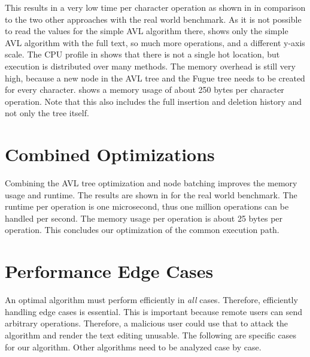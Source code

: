 This results in a very low time per character operation as shown in  in comparison to the two other approaches with the real world benchmark. As it is not possible to read the values for the \gls{simple AVL algorithm} there,  shows only the \gls{simple AVL algorithm} with the full text, so much more operations, and a different y-axis scale.
The CPU profile in  shows that there is not a single hot location, but execution is distributed over many methods. The memory overhead is still very high, because a new node in the AVL tree and the Fugue tree needs to be created for every character.  shows a memory usage of about 250 bytes per character operation. Note that this also includes the full insertion and deletion history and not only the tree itself.


\section{Combined Optimizations}

Combining the AVL tree optimization and node batching improves the memory usage and runtime. The results are shown in  for the real world benchmark. The runtime per operation is one microsecond, thus one million operations can be handled per second. The memory usage per operation is about 25 bytes per operation. This concludes our optimization of the common execution path.



\section{Performance Edge Cases} \label{edge-cases}

An optimal algorithm must perform efficiently in \textit{all} cases. Therefore, efficiently handling edge cases is essential. This is important because remote users can send arbitrary operations. Therefore, a malicious user could use that to attack the algorithm and render the text editing unusable. The following are specific cases for our algorithm. Other algorithms need to be analyzed case by case.

